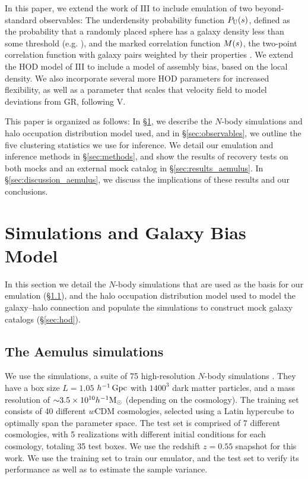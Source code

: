 In this paper, we extend the work of \aemulus III \citep{Zhai2019} to include emulation of two beyond-standard observables:
The underdensity probability function $P_\mathrm{U}(s)$, defined as the probability that a randomly placed sphere has a galaxy density less than some threshold (e.g. \citealt{HoyleVogeley2004}), and the marked correlation function $M(s)$, the two-point correlation function with galaxy pairs weighted by their properties \citep{Sheth2004}.
We extend the HOD model of \aemulus III to include a model of assembly bias, based on the local density.
We also incorporate several more HOD parameters for increased flexibility, as well as a parameter that scales that velocity field to model deviations from GR, following \aemulus V.

This paper is organized as follows:
In \S\ref{sec:sims_gals}, we describe the $N$-body simulations and halo occupation distribution model used, and in \S\ref{sec:observables}, we outline the five clustering statistics we use for inference.
We detail our emulation and inference methods in \S\ref{sec:methods}, and show the results of recovery tests on both \aemulus mocks and an external mock catalog in \S\ref{sec:results_aemulus}.
In \S\ref{sec:discussion_aemulus}, we discuss the implications of these results and our conclusions.


\section{Simulations and Galaxy Bias Model}
\label{sec:sims_gals}

In this section we detail the \aemulus $N$-body simulations that are used as the basis for our emulation (\S\ref{sec:aemulus}), and the halo occupation distribution model used to model the galaxy--halo connection and populate the simulations to construct mock galaxy catalogs (\S\ref{sec:hod}). 

\subsection{The Aemulus simulations}
\label{sec:aemulus}

We use the \aemulus simulations, a suite of 75 high-resolution $N$-body simulations \citep{DeRose2018}.
They have a box size $L = 1.05$ $h^{-1}\,\mathrm{Gpc}$ with $1400^3$ dark matter particles, and a mass resolution of $\mathord{\sim}3.5\times10^{10}h^{-1}\text{M}_{\odot}$ (depending on the cosmology).
The training set consists of 40 different $w$CDM cosmologies, selected using a Latin hypercube to optimally span the parameter space.
The test set is comprised of 7 different cosmologies, with 5 realizations with different initial conditions for each cosmology, totaling 35 test boxes.
We use the redshift $z=0.55$ snapshot for this work.
We use the training set to train our emulator, and the test set to verify its performance as well as to estimate the sample variance.

